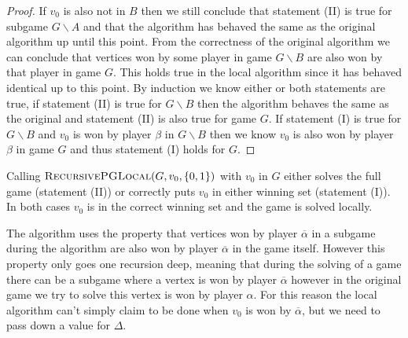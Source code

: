 \begin{theorem}
\begin{proof}
	If $v_0$ is also not in $B$ then we still conclude that statement (II) is true for subgame $G\backslash A$ and that the algorithm has behaved the same as the original algorithm up until this point. From the correctness of the original algorithm we can conclude that vertices won by some player in game $G\backslash B$ are also won by that player in game $G$. This holds true in the local algorithm since it has behaved identical up to this point. By induction we know either or both statements are true, if statement (II) is true for $G\backslash B$ then the algorithm behaves the same as the original and statement (II) is also true for game $G$. If statement (I) is true for $G \backslash B$ and $v_0$ is won by player $\beta$ in $G\backslash B$ then we know $v_0$ is also won by player $\beta$ in game $G$ and thus statement (I) holds for $G$.
\end{proof}
\end{theorem}

Calling $\textsc{RecursivePGLocal}(G, v_0, \{0,1\})$ with $v_0$ in $G$ either solves the full game (statement (II)) or correctly puts $v_0$ in either winning set (statement (I)). In both cases $v_0$ is in the correct winning set and the game is solved locally.

The algorithm uses the property that vertices won by player $\overline{\alpha}$ in a subgame during the algorithm are also won by player $\overline{\alpha}$ in the game itself. However this property only goes one recursion deep, meaning that during the solving of a game there can be a subgame where a vertex is won by player $\overline{\alpha}$ however in the original game we try to solve this vertex is won by player $\alpha$. For this reason the local algorithm can't simply claim to be done when $v_0$ is won by $\overline{\alpha}$, but we need to pass down a value for $\Delta$.

